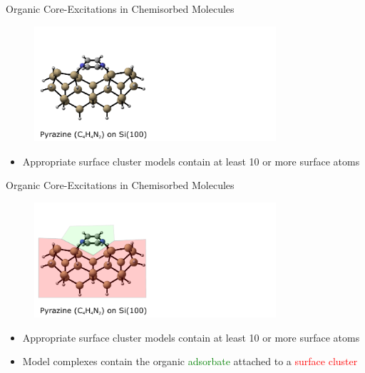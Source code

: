 \documentclass[t]{beamer}
\begin{document}
\begin{frame}{Organic Core-Excitations in Chemisorbed Molecules}
\begin{figure}
\includegraphics[width=0.8\textwidth]{pyrazine_si_100_slide_1.pdf}
\end{figure}
\begin{itemize}
\item Appropriate surface cluster models contain at least 10 or more surface atoms
\end{itemize}
\end{frame}

\begin{frame}{Organic Core-Excitations in Chemisorbed Molecules}
\begin{figure}
\includegraphics[width=0.8\textwidth]{pyrazine_si_100_slide_2.pdf}
\end{figure}
\begin{itemize}
\item Appropriate surface cluster models contain at least 10 or more surface atoms
\item Model complexes contain the organic \textcolor{green}{adsorbate} attached to a \textcolor{red}{surface cluster}
\end{itemize}
\end{frame}
\end{document}
